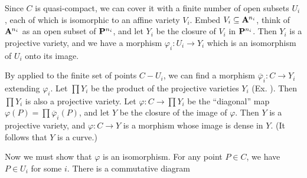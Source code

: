 {Since $C$ is quasi-compact, we can cover it with a finite number of open subsets $U_i$, each of which is isomorphic to an affine variety $V_i$. Embed $V_i\subseteq\AffSpace{n_i}$, think of $\AffSpace{n_i}$ as an open subset of $\mathbf{P}^{n_i}$, and let $Y_i$ be the closure of $V_i$ in $\mathbf{P}^{n_i}$. Then $Y_i$ is a projective variety, and we have a morphism $\varphi_i\colon U_i\to Y_i$ which is an isomorphism of $U_i$ onto its image.

By  applied to the finite set of points $C-U_i$, we can find a morphism $\overline\varphi_i\colon C\to Y_i$ extending $\varphi_i$. Let $\prod Y_i$ be the product of the projective varieties $Y_i$ (Ex. ). Then $\prod Y_i$ is also a projective variety. Let $\varphi\colon C\to\prod Y_i$ be the \textquotedblleft{}diagonal\textquotedblright{} map $\varphi(P)=\prod\overline\varphi_i(P)$, and let $Y$ be the closure of the image of $\varphi$. Then $Y$ is a projective variety, and $\varphi\colon C\to Y$ is a morphism whose image is dense in $Y$. (It follows that $Y$ is a curve.)

Now we must show that $\varphi$ is an isomorphism. For any point $P\in C$, we have $P\in U_i$ for some $i$. There is a commutative diagram}
